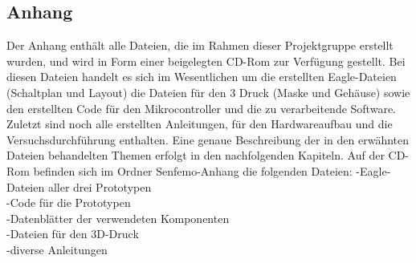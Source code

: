 \subsection{Anhang}  \label{anhang-subsec}


Der Anhang enthält alle Dateien, die im Rahmen dieser Projektgruppe erstellt wurden, und wird in Form einer beigelegten CD-Rom zur Verfügung gestellt.
Bei diesen Dateien handelt es sich im Wesentlichen um die erstellten Eagle-Dateien (Schaltplan und Layout) die Dateien für den 3 Druck (Maske und Gehäuse) sowie den erstellten Code für den Mikrocontroller und die zu verarbeitende Software.
Zuletzt sind noch alle erstellten Anleitungen, für den Hardwareaufbau und die Versuchsdurchführung enthalten. Eine genaue Beschreibung der in den erwähnten Dateien behandelten Themen erfolgt in den nachfolgenden Kapiteln.
Auf der CD-Rom befinden sich im Ordner Senfemo-Anhang die folgenden Dateien:
\newline
-Eagle-Dateien aller drei Prototypen
\\
-Code für die Prototypen
\\
-Datenblätter der verwendeten Komponenten
\\
-Dateien für den 3D-Druck
\\
-diverse Anleitungen 
